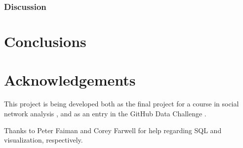 \documentclass[11pt]{article}
\begin{document}


\subsubsection{Discussion}

\section{Conclusions}

\section{Acknowledgements}
This project is being developed both as the final project for a course in social
network analysis \cite{snacourse}, and as an entry in the GitHub Data Challenge
\cite{doll13}.

Thanks to Peter Faiman and Corey Farwell for help regarding SQL and
visualization, respectively.



\end{document}
